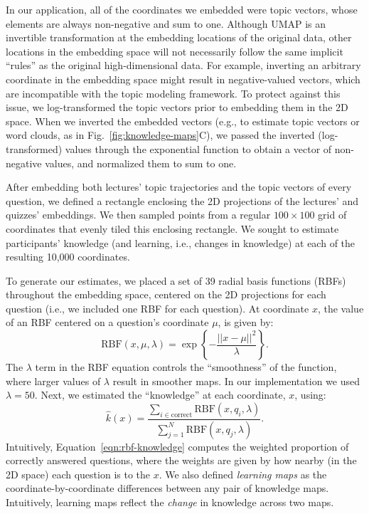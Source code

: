 \documentclass[10pt]{article}
\begin{document}
In our application, all of the coordinates we embedded were topic vectors,
whose elements are always non-negative and sum to one. Although UMAP is an
invertible transformation at the embedding locations of the original data,
other locations in the embedding space will not necessarily follow the same
implicit ``rules'' as the original high-dimensional data. For example,
inverting an arbitrary coordinate in the embedding space might result in
negative-valued vectors, which are incompatible with the topic modeling
framework. To protect against this issue, we log-transformed the topic vectors
prior to embedding them in the 2D space. When we inverted the embedded vectors
(e.g., to estimate topic vectors or word clouds, as in
Fig.~\ref{fig:knowledge-maps}C), we passed the inverted (log-transformed)
values through the exponential function to obtain a vector of non-negative
values, and normalized them to sum to one.

After embedding both lectures' topic trajectories and the topic vectors of
every question, we defined a rectangle enclosing the 2D projections of the
lectures' and quizzes' embeddings. We then sampled points from a regular $100
\times 100$ grid of coordinates that evenly tiled this enclosing rectangle. We
sought to estimate participants' knowledge (and learning, i.e., changes in
knowledge) at each of the resulting 10,000 coordinates.

To generate our estimates, we placed a set of 39 radial basis functions (RBFs)
throughout the embedding space, centered on the 2D projections for each
question (i.e., we included one RBF for each question). At coordinate $x$, the
value of an RBF centered on a question's coordinate $\mu$, is given by:
\begin{equation}
    \mathrm{RBF}(x, \mu, \lambda) = \exp\left\{-\frac{||x - \mu||^2}{\lambda}\right\}.
    \label{eqn:rbf}
\end{equation}
The $\lambda$ term in the RBF equation controls the ``smoothness'' of the
function, where larger values of $\lambda$ result in smoother maps. In our
implementation we used $\lambda = 50$.  Next, we estimated the ``knowledge''
at each coordinate, $x$, using:
\begin{equation}
    \hat{k}(x) = \frac{\sum_{i \in \mathrm{correct}} \mathrm{RBF}(x, q_i, \lambda)}{\sum_{j = 1}^N \mathrm{RBF}(x, q_j, \lambda)}.
    \label{eqn:rbf-knowledge}
\end{equation}
Intuitively, Equation~\ref{eqn:rbf-knowledge} computes the weighted proportion of
correctly answered questions, where the weights are given by how nearby (in the 2D space)
each question is to the $x$.  We also defined \textit{learning maps} as the coordinate-by-coordinate
differences between any pair of knowledge maps.  Intuitively, learning maps reflect the \textit{change}
in knowledge across two maps.
\end{document}
